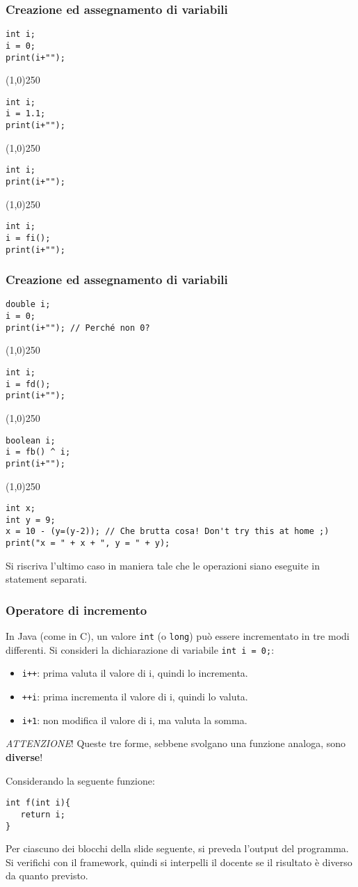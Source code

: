 \documentclass{beamer}
\begin{document}
\begin{frame}[fragile]
\frametitle{Creazione ed assegnamento di variabili}
\begin{verbatim}
int i;
i = 0;
print(i+"");
\end{verbatim}
\line(1,0){250}
\begin{verbatim}
int i;
i = 1.1;
print(i+"");
\end{verbatim}
\line(1,0){250}
\begin{verbatim}
int i;
print(i+"");
\end{verbatim}
\line(1,0){250}
\begin{verbatim}
int i;
i = fi();
print(i+"");
\end{verbatim}
\end{frame}

\begin{frame}[fragile]
\frametitle{Creazione ed assegnamento di variabili}
\scriptsize
\begin{verbatim}
double i;
i = 0;
print(i+""); // Perché non 0?
\end{verbatim}
\line(1,0){250}
\begin{verbatim}
int i;
i = fd();
print(i+"");
\end{verbatim}
\line(1,0){250}
\begin{verbatim}
boolean i;
i = fb() ^ i;
print(i+"");
\end{verbatim}
\line(1,0){250}
\begin{verbatim}
int x;
int y = 9;
x = 10 - (y=(y-2)); // Che brutta cosa! Don't try this at home ;)
print("x = " + x + ", y = " + y);
\end{verbatim}
\normalsize
Si riscriva l'ultimo caso in maniera tale che le operazioni siano eseguite in statement separati.
\end{frame}

\begin{frame}[fragile]
\frametitle{Operatore di incremento}
In Java (come in C), un valore \texttt{int} (o \texttt{long}) può essere incrementato in tre  modi differenti. Si consideri la dichiarazione di variabile \texttt{int i = 0;}:
\begin{itemize}
 \item \texttt{i++}: prima valuta il valore di i, quindi lo incrementa.
 \item \texttt{++i}: prima incrementa il valore di i, quindi lo valuta.
 \item \texttt{i+1}: non modifica il valore di i, ma valuta la somma.
\end{itemize}
\emph{ATTENZIONE}! Queste tre forme, sebbene svolgano una funzione analoga, sono \textbf{diverse}!

Considerando la seguente funzione:
\begin{verbatim}
int f(int i){
   return i;
}
\end{verbatim}
Per ciascuno dei blocchi della slide seguente, si preveda l'output del programma. Si verifichi con il framework, quindi si interpelli il docente se il risultato è diverso da quanto previsto.
\end{frame}
\end{document}
